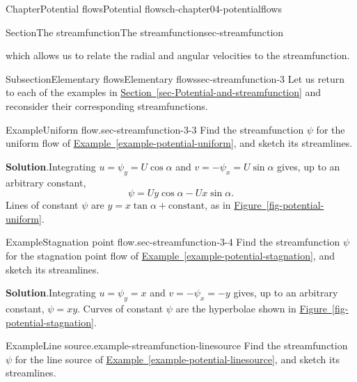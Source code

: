 \documentclass[oneside,10pt,]{book}
\newcommand{\blocktitlefont}{\relax}
\newcommand{\xreffont}{\relax}
\numberwithin{equation}{section}
\begin{document}
\begin{chapterptx}{Chapter}{Potential flows}{}{Potential flows}{}{}{ch-chapter04-potentialflows}
\begin{sectionptx}{Section}{The streamfunction}{}{The streamfunction}{}{}{sec-streamfunction}
\begin{introduction}{}
\begin{equation}
\end{equation}
which allows us to relate the radial and angular velocities to the streamfunction.%
\end{introduction}%
%
%
\typeout{************************************************}
\typeout{************************************************}
%
\begin{subsectionptx}{Subsection}{Elementary flows}{}{Elementary flows}{}{}{sec-streamfunction-3}
Let us return to each of the examples in \hyperref[sec-Potential-and-streamfunction]{Section~{\xreffont\ref{sec-Potential-and-streamfunction}}} and reconsider their corresponding streamfunctions.%
\begin{example}{Example}{Uniform flow.}{sec-streamfunction-3-3}%
Find the streamfunction \(\psi\) for the uniform flow of \hyperref[example-potential-uniform]{Example~{\xreffont\ref{example-potential-uniform}}}, and sketch its streamlines.%
\par\smallskip%
\noindent\textbf{\blocktitlefont Solution}.\hypertarget{sec-streamfunction-3-3-4}{}\quad{}Integrating \(u = \psi_y = U\cos\alpha\) and \(v = -\psi_x = U\sin\alpha\) gives, up to an arbitrary constant,%
\begin{equation*}
\psi = Uy\cos\alpha - Ux\sin\alpha.
\end{equation*}
Lines of constant \(\psi\) are \(y = x\tan\alpha + \textrm{constant}\), as in \hyperref[fig-potential-uniform]{Figure~{\xreffont\ref{fig-potential-uniform}}}.%
\end{example}
\begin{example}{Example}{Stagnation point flow.}{sec-streamfunction-3-4}%
Find the streamfunction \(\psi\) for the stagnation point flow of \hyperref[example-potential-stagnation]{Example~{\xreffont\ref{example-potential-stagnation}}}, and sketch its streamlines.%
\par\smallskip%
\noindent\textbf{\blocktitlefont Solution}.\hypertarget{sec-streamfunction-3-4-4}{}\quad{}Integrating \(u = \psi_y = x\) and \(v = -\psi_x = -y\) gives, up to an arbitrary constant, \(\psi = xy\). Curves of constant \(\psi\) are the hyperbolae shown in \hyperref[fig-potential-stagnation]{Figure~{\xreffont\ref{fig-potential-stagnation}}}.%
\end{example}
\begin{example}{Example}{Line source.}{example-streamfunction-linesource}%
Find the streamfunction \(\psi\) for the line source of \hyperref[example-potential-linesource]{Example~{\xreffont\ref{example-potential-linesource}}}, and sketch its streamlines.%

\end{example}
\end{subsectionptx}
\end{sectionptx}
\end{chapterptx}
\end{document}
